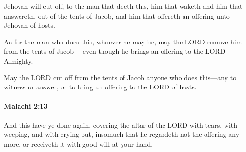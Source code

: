 			\begin{versebox}
					\item[BHS] 
					\item[LXX] 
					\item[ASV] Jehovah will cut off, to the man that doeth this, him that waketh and him that answereth, out of the tents of Jacob, and him that offereth an offering unto Jehovah of hosts.
					\item[NIV] As for the man who does this, whoever he may be, may the LORD remove him from the tents of Jacob —even though he brings an offering to the LORD Almighty.
					\item[NRSV] May the LORD cut off from the tents of Jacob anyone who does this—any to witness or answer, or to bring an offering to the LORD of hosts.
			\end{versebox}

		\paragraph{Malachi 2:13} %
			\label{MALACHI-2-13}

			And this have ye done again, covering the altar of the LORD with tears, with weeping, and with crying out, insomuch that he regardeth not the offering any more, or receiveth it with good will at your hand.

